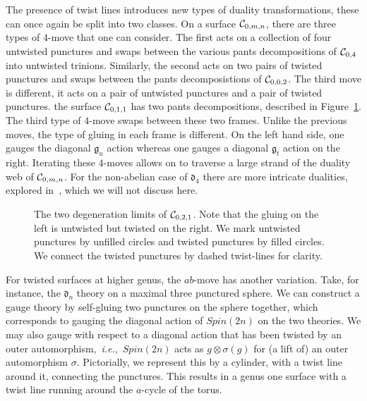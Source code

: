 \documentclass[a4paper]{article}
\def\CC{{\cal C}}
\def\df{\mathfrak{d}}
\def\gf{\mathfrak{g}}
\def \ie{{\it i.e.}}
\begin{document}
The presence of twist lines introduces new types of duality transformations, these can once again be split into two classes. On a surface $\CC_{0,m,n}$, there are three types of $4$-move that one can consider. The first acts on a collection of four untwisted punctures and swaps between the various pants decompositions of $\CC_{0,4}$ into untwisted trinions. Similarly, the second acts on two pairs of twisted punctures and swaps between the pants decomposistions of $\CC_{0,0,2}$. The third move is different, it acts on a pair of untwisted punctures and a pair of twisted punctures. the surface $\CC_{0,1,1}$ has two pants decompositions, described in Figure~\ref{fig:ut-move}. The third type of $4$-move swaps between these two frames. Unlike the previous moves, the type of gluing in each frame is different. On the left hand side, one gauges the diagonal $\gf_u$ action whereas one gauges a diagonal $\gf_t$ action on the right. Iterating these $4$-moves allows on to traverse a large strand of the duality web of $\CC_{0,m,n}$. For the non-abelian case of $\df_4$ there are more intricate dualities, explored in~\cite{Distler:2021cwz}, which we will not discuss here.
\begin{figure}[h]
\caption{The two degeneration limits of $\CC_{0,2,1}$. Note that the gluing on the left is untwisted but twisted on the right. We mark untwisted punctures by unfilled circles and twisted punctures by filled circles. We connect the twisted punctures by dashed twist-lines for clarity.}
\label{fig:ut-move}
\end{figure}

For twisted surfaces at higher genus, the $ab$-move has another variation. Take, for instance, the $\df_n$ theory on a maximal three punctured sphere. We can construct a gauge theory by self-gluing two punctures on the sphere together, which corresponds to gauging the diagonal action of $Spin(2n)$ on the two theories. We may also gauge with respect to a diagonal action that has been twisted by an outer automorphism,~\ie,~$Spin(2n)$ acts as $g\otimes\sigma(g)$ for (a lift of) an outer automorphism $\sigma$. Pictorially, we represent this by a cylinder, with a twist line around it, connecting the punctures. This results in a genus one surface with a twist line running around the $a$-cycle of the torus.
\end{document}
